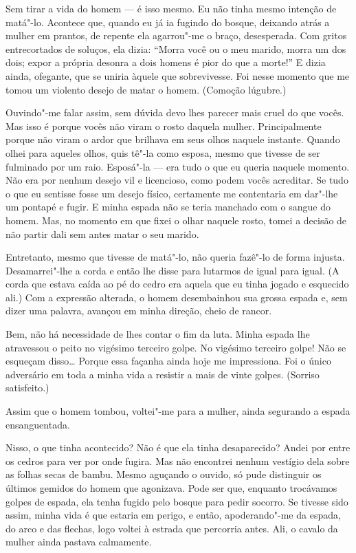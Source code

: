 Sem tirar a vida do homem --- é isso mesmo. Eu não tinha mesmo intenção de
matá"-lo. Acontece que, quando eu já ia fugindo do bosque, deixando
atrás a mulher em prantos, de repente ela agarrou"-me o braço,
desesperada. Com gritos entrecortados de soluços, ela dizia: ``Morra
você ou o meu marido, morra um dos dois; expor a própria desonra a dois
homens é pior do que a morte!'' E dizia ainda, ofegante, que se uniria
àquele que sobrevivesse. Foi nesse momento que me tomou  um violento
desejo de matar o homem. (Comoção lúgubre.)

Ouvindo"-me falar assim, sem dúvida devo lhes parecer mais cruel do que
vocês. Mas isso é porque vocês não viram o rosto daquela mulher.
Principalmente porque não viram o ardor que brilhava em seus olhos
naquele instante. Quando olhei para aqueles olhos, quis tê"-la como
esposa, mesmo que tivesse de ser fulminado por um raio. Esposá"-la --- era
tudo o que eu queria naquele momento. Não era por nenhum desejo vil e
licencioso, como podem vocês acreditar. Se tudo o que eu sentisse fosse
um desejo físico, certamente me contentaria em dar"-lhe um pontapé e
fugir. E minha espada não se teria manchado com o sangue do homem. Mas,
no momento em que fixei o olhar naquele rosto, tomei a decisão de não
partir dali sem antes matar o seu marido.

Entretanto, mesmo que tivesse de matá"-lo, não queria fazê"-lo de forma injusta. 
Desamarrei"-lhe a corda e então lhe disse para lutarmos de igual para igual. 
(A corda que estava caída ao pé do cedro era aquela que eu tinha jogado e esquecido ali.) 
Com a expressão alterada, o homem desembainhou sua grossa espada e, sem dizer uma palavra, 
avançou em minha direção, cheio de rancor.

Bem, não há necessidade de lhes contar o fim da luta. Minha espada lhe
atravessou o peito no vigésimo terceiro golpe. No vigésimo terceiro
golpe! Não se esqueçam disso\ldots{} Porque essa façanha ainda hoje me
impressiona. Foi o único adversário em toda a minha vida a resistir a
mais de vinte golpes. (Sorriso satisfeito.)

Assim que o homem tombou, voltei"-me para a mulher, ainda segurando a
espada ensanguentada. 

Nisso, o que tinha acontecido? Não é que ela tinha desaparecido? 
Andei por entre os cedros para ver por onde fugira. Mas
não encontrei nenhum vestígio dela sobre as folhas secas de bambu. Mesmo
aguçando o ouvido, só pude distinguir os últimos gemidos do homem que
agonizava. Pode ser que, enquanto trocávamos golpes de espada, ela
tenha fugido pelo bosque para pedir socorro. Se tivesse sido assim,
minha vida é que estaria em perigo, e então, apoderando"-me da espada,
do arco e das flechas, logo voltei à estrada que percorria antes. Ali,
o cavalo da mulher ainda pastava calmamente.

